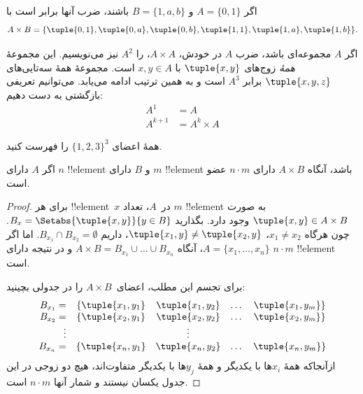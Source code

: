 \documentclass[../../../include/open-logic-section]{subfiles}
\begin{document}
\begin{ex}
اگر $A = \{0, 1\}$ و $B = \{1, a, b\}$ باشند، ضرب آنها برابر است با
\[
A \times B = \{ \tuple{0, 1}, \tuple{0, a}, \tuple{0, b},
    \tuple{1, 1}, \tuple{1, a}, \tuple{1, b} \}.
\]
\end{ex}

\begin{ex}
اگر $A$ مجموعه‌ای باشد، ضرب $A$ در خودش، $A \times A$، را
$A^2$ نیز می‌نویسیم. این مجموعهٔ \emph{همهٔ} زوج‌های $\tuple{x, y}$
با $x, y \in A$ است. مجموعهٔ همهٔ سه‌تایی‌های $\tuple{x, y, z}$
برابر $A^3$ است و به همین ترتیب ادامه می‌یابد. می‌توانیم تعریفی
بازگشتی به دست دهیم:
\begin{align*}
  A^1 & = A\\
  A^{k+1} & = A^k \times A
\end{align*}
\end{ex}

\begin{prob}
همهٔ اعضای $\{1, 2, 3\}^3$ را فهرست کنید.
\end{prob}

\begin{prop}
اگر $A$ دارای $n$ !!{element} و $B$ دارای $m$ !!{element} باشد،
آنگاه $A \times B$ دارای $n\cdot m$ عضو است.
\end{prop}

\begin{proof}
برای هر !!{element}~$x$ در~$A$، تعداد $m$ !!{element} به صورت
$\tuple{x, y} \in A \times B$ وجود دارد. بگذارید
$B_x = \Setabs{\tuple{x, y}}{y \in B}$. چون هرگاه $x_1 \neq x_2$،
$\tuple{x_1, y} \neq \tuple{x_2, y}$، داریم
$B_{x_1} \cap B_{x_2} = \emptyset$. اما اگر
$A = \{x_1, \dots, x_n\}$، آنگاه
$A \times B = B_{x_1} \cup \dots \cup B_{x_n}$ و در نتیجه دارای
$n\cdot m$ !!{element} است.

برای تجسم این مطلب، اعضای~$A \times B$ را در جدولی بچینید:
\[
\begin{array}{rcccc}
  B_{x_1} = & \{\tuple{x_1, y_1} & \tuple{x_1, y_2} & \dots & \tuple{x_1, y_m}\}\\
  B_{x_2} = & \{\tuple{x_2, y_1} & \tuple{x_2, y_2} & \dots & \tuple{x_2, y_m}\}\\
  \vdots & & \vdots\\
  B_{x_n} = & \{\tuple{x_n, y_1} & \tuple{x_n, y_2} & \dots & \tuple{x_n, y_m}\}
\end{array}
\]
ازآنجاکه همهٔ $x_i$ها با یکدیگر و همهٔ $y_j$ها با یکدیگر متفاوت‌اند،
هیچ دو زوجی در این جدول یکسان نیستند و شمار آنها $n\cdot m$ است.
\end{proof}
\end{document}
